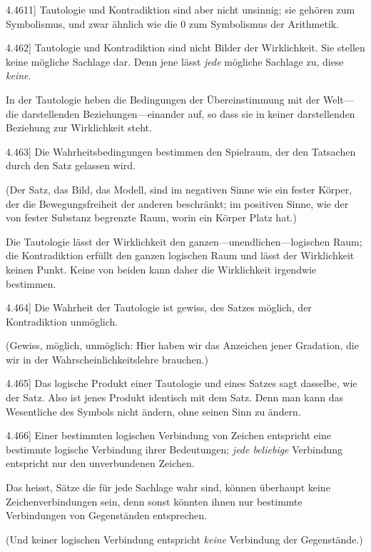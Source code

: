 \documentclass[12pt,oneside]{book}[2007/10/19]
\newcommand{\PropERef}[1]{\hyperref[PropE:#1]{#1}}
\newcommand{\PropositionG}[2]{%
  \item[\phantomsection\label{PropG:#1}\PropERef{#1}] #2%
}
\newcommand{\Emph}[1]{\emph{#1}}%
\begin{document}
\begin{propositions}
\PropositionG{4.4611}
{Tautologie und Kontradiktion sind aber nicht
unsinnig; sie gehören zum Symbolismus, und
zwar ähnlich wie die \glqq{}0\grqq{} zum Symbolismus der
Arithmetik.}


\PropositionG{4.462}
{Tautologie und Kontradiktion sind nicht Bilder
der Wirklichkeit. Sie stellen keine mögliche
Sachlage dar. Denn jene lässt \Emph{jede} mögliche
Sachlage zu, diese \Emph{keine}.

In der Tautologie heben die Bedingungen der
Übereinstimmung mit der Welt---die darstellenden
Beziehungen---einander auf, so dass sie in keiner
darstellenden Beziehung zur Wirklichkeit steht.}


\PropositionG{4.463}
{Die Wahrheitsbedingungen bestimmen den
Spielraum, der den Tatsachen durch den Satz
gelassen wird.

(Der Satz, das Bild, das Modell, sind im
negativen Sinne wie ein fester Körper, der die
Bewegungsfreiheit der anderen beschränkt; im
positiven Sinne, wie der von fester Substanz
begrenzte Raum, worin ein Körper Platz hat.)

Die Tautologie lässt der Wirklichkeit den gan\-zen---un\-end\-li\-chen---lo\-gi\-schen
Raum; die Kontradiktion
erfüllt den ganzen logischen Raum und lässt
der Wirklichkeit keinen Punkt. Keine von beiden
kann daher die Wirklichkeit irgendwie bestimmen.}


\PropositionG{4.464}
{Die Wahrheit der Tautologie ist gewiss, des
Satzes möglich, der Kontradiktion unmöglich.

(Gewiss, möglich, unmöglich: Hier haben wir
das Anzeichen jener Gradation, die wir in der
Wahrscheinlichkeitslehre brauchen.)}


\PropositionG{4.465}
{Das logische Produkt einer Tautologie und
eines Satzes sagt dasselbe, wie der Satz. Also ist
jenes Produkt identisch mit dem Satz. Denn man
kann das Wesentliche des Symbols nicht ändern,
ohne seinen Sinn zu ändern.}


\PropositionG{4.466}
{Einer bestimmten logischen Verbindung von
Zeichen entspricht eine bestimmte logische Verbindung
ihrer Bedeutungen; \Emph{jede beliebige}
Verbindung entspricht nur den unverbundenen
Zeichen.

Das heisst, Sätze die für jede Sachlage wahr
sind, können überhaupt keine Zeichenverbindungen
sein, denn sonst könnten ihnen nur bestimmte
Verbindungen von Gegenständen entsprechen.

(Und keiner logischen Verbindung entspricht
\Emph{keine} Verbindung der Gegenstände.)

}
\end{propositions}
\end{document}
